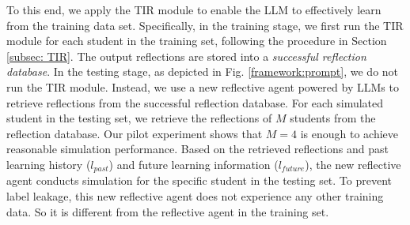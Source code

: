 To this end, we apply the TIR module to enable the LLM to effectively learn from the training data set.
Specifically, in the training stage, we first run the TIR module for each student in the training set, following the procedure in Section \ref{subsec: TIR}. The output reflections are stored into a \textit{successful reflection database}. 
In the testing stage, as depicted in Fig. \ref{framework:prompt}, we do not run the TIR module. Instead, we use a new reflective agent powered by LLMs to retrieve reflections from the successful reflection database. For each simulated student in the testing set, we retrieve the reflections of 
$M$ students from the reflection database.  Our pilot experiment shows that $M=4$ is enough to achieve reasonable simulation performance.
Based on the retrieved reflections and past learning history ($l_{past}$) and future learning information ($l_{future}$), the new reflective agent conducts simulation for the specific student in the testing set.  To prevent label leakage, this new reflective agent does not experience any other training data. So it is different from the reflective agent in the training set. 


